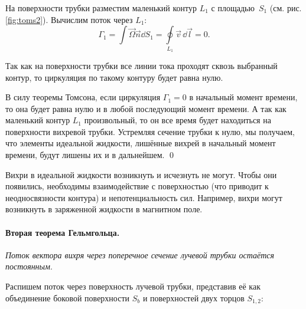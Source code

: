 На поверхности трубки разместим маленький контур $L_1$ с площадью~$S_1$ (см. рис. \ref{fig:toms2}). Вычислим поток через $L_1$:
\begin{equation}
	\Gamma_1=\int \vec\Omega \vec{n}\dd S_1 = \oint\limits_{L_1} \vec{v} \,\dd\vec{l} = 0.
\end{equation}

Так как на поверхности трубки все линии тока проходят сквозь выбранный контур, то циркуляция по такому контуру будет равна нулю.

В силу теоремы Томсона, если циркуляция $\Gamma_1=0$ в начальный момент времени, то она будет равна нулю и в любой последующий момент времени. А так как маленький контур $L_1$ произвольный, то он все время будет находиться на поверхности вихревой трубки. Устремляя сечение трубки к нулю, мы получаем, что элементы идеальной жидкости, лишённые вихрей в начальный момент времени, будут лишены их и в дальнейшем.
\qed

Вихри в идеальной жидкости возникнуть и исчезнуть не могут. Чтобы они появились, необходимы взаимодействие с поверхностью (что приводит к неодносвязности контура) и непотенциальность сил. Например, вихри могут возникнуть в заряженной жидкости в магнитном поле.

\paragraph{Вторая теорема Гельмгольца. }\textit{Поток вектора вихря через поперечное сечение лучевой трубки остаётся постоянным}.

Распишем поток через поверхность лучевой трубки, представив её как объединение боковой поверхности  $S_b$ и поверхностей двух торцов $S_{1,2}$:

